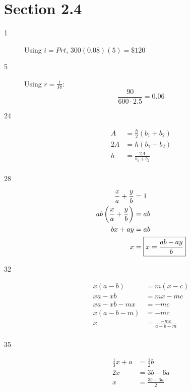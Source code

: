 \documentclass[letterpaper, landscape]{exam}
\begin{document}
    \section{Section 2.4} %
    \begin{description}
      
      \item[1] Using $i = Prt$, $300(0.08)(5) = \boxed{ \$120 }$

      \item[5] Using $r = \frac{i}{Pt}$:
        \[
          \frac{90}{600 \cdot 2.5} = \boxed{ 0.06 } 
        \]

      \item[24]
        \begin{align*}
          A  & = \frac{h}{2} (b_1 + b_2) \\
          2A & = h(b_1 + b_2) \\
          h  & = \boxed{ \frac{2A}{b_1 + b_2} } \\
        \end{align*}

      \item[28]
      \begin{align*}
        \frac{x}{a} + \frac{y}{b}            & = 1 \\
        ab \del{ \frac{x}{a} + \frac{y}{b} } & = ab  \\
        bx + ay                              & =ab \\
        x                                    & = \boxed{ x = \frac{ab - ay}{b} } \\
      \end{align*}

      \item[32]
        \begin{align*}
          x(a-b)   & = m(x-c) \\
          xa-xb    & = mx-mc \\
          xa-xb-mx & = -mc \\
          x(a-b-m) & = -mc \\
          x        & = \boxed{ \frac{-mc}{a - b - m} } \\
        \end{align*}

      \item[35]
      \begin{align*}
        \frac{1}{3}x + a & = \frac{1}{2}b \\
        2x               & = 3b - 6a \\
        x                & = \boxed{ \frac{3b - 6a}{2} } \\
      \end{align*}


\end{description}
\end{document}
